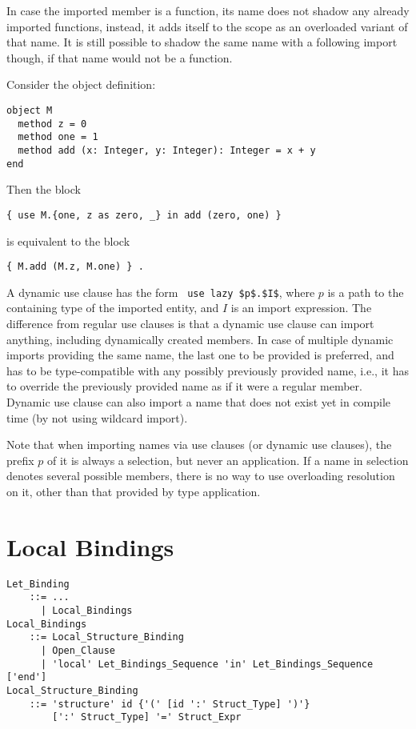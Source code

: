 In case the imported member is a function, its name does not shadow any already imported functions, instead, it adds itself to the scope as an overloaded variant of that name. It is still possible to shadow the same name with a following import though, if that name would not be a function. 

\example Consider the object definition:
\begin{lstlisting}
object M
  method z = 0
  method one = 1
  method add (x: Integer, y: Integer): Integer = x + y
end
\end{lstlisting}
Then the block
\begin{lstlisting}
{ use M.{one, z as zero, _} in add (zero, one) }
\end{lstlisting}
is equivalent to the block
\begin{lstlisting}
{ M.add (M.z, M.one) } .
\end{lstlisting}

A dynamic use clause has the form ~\lstinline!use lazy $p$.$I$!, where $p$ is a path to the containing type of the imported entity, and $I$ is an import expression. The difference from regular use clauses is that a dynamic use clause can import anything, including dynamically created members. In case of multiple dynamic imports providing the same name, the last one to be provided is preferred, and has to be type-compatible with any possibly previously provided name, i.e., it has to override the previously provided name as if it were a regular member. Dynamic use clause can also import a name that does not exist yet in compile time (by not using wildcard import). 

Note that when importing names via use clauses (or dynamic use clauses), the prefix $p$ of it is always a selection, but never an application. If a name in selection denotes several possible members, there is no way to use overloading resolution on it, other than that provided by type application. 






\section{Local Bindings}
\label{sec:local-bindings}

\grammar\begin{lstlisting}
Let_Binding
    ::= ...
      | Local_Bindings
Local_Bindings
    ::= Local_Structure_Binding
      | Open_Clause
      | 'local' Let_Bindings_Sequence 'in' Let_Bindings_Sequence ['end']
Local_Structure_Binding
    ::= 'structure' id {'(' [id ':' Struct_Type] ')'} 
        [':' Struct_Type] '=' Struct_Expr
\end{lstlisting}




